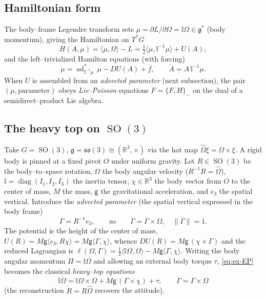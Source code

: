\documentclass[11pt]{article}
\theoremstyle{definition}
\theoremstyle{plain}
\newcommand{\g}{\mathfrak{g}}
\newcommand{\ad}{\operatorname{ad}}
\newcommand{\inner}[2]{\langle #1, #2\rangle}
\newcommand{\norm}[1]{\lVert #1 \rVert}
\newcommand{\so}{\mathfrak{so}}
\newcommand{\grav}{\mathsf{g}}
\newcommand{\hatm}[1]{\widehat{#1}}
\newcommand{\Inertia}{\mathbb{I}}
\DeclareMathOperator{\SO}{SO}
\begin{document}
\subsection{Hamiltonian form}
\label{ss:ex-hamiltonian}

The body--frame Legendre transform sets $\mu=\partial L/\partial\Omega=\Inertia\Omega\in\g^{*}$
(body momentum), giving the Hamiltonian on $T^{*}G$
\begin{equation}\label{eq:ex-hamiltonian}
  H(A,\mu)=\inner{\mu}{\Omega}-L=\tfrac12\inner{\mu}{\Inertia^{-1}\mu}+U(A),
\end{equation}
and the left--trivialized Hamilton equations (with forcing)
\begin{equation}\label{eq:ex-ham-eqs}
  \dot\mu=\ad^{*}_{\Inertia^{-1}\mu}\,\mu-DU(A)+f,
  \qquad \dot A=A\,\Inertia^{-1}\mu .
\end{equation}
When $U$ is assembled from an \emph{advected parameter} (next subsection), the pair
$(\mu,\text{parameter})$ obeys \emph{Lie--Poisson} equations $\dot F=\{F,H\}_{-}$ on the dual
of a semidirect--product Lie algebra.

\subsection{The heavy top on $\SO(3)$}
\label{ss:heavytop}

Take $G=\SO(3)$, $\g=\so(3)\cong(\mathbb{R}^{3},\times)$ via the hat map
$\hatm{\Omega}\xi=\Omega\times\xi$. A rigid body is pinned at a fixed pivot $O$ under uniform
gravity. Let $R\in\SO(3)$ be the body--to--space rotation, $\Omega$ the body angular
velocity ($R^{-1}\dot R=\hatm{\Omega}$), $\Inertia=\operatorname{diag}(I_{1},I_{2},I_{3})$ the
inertia tensor, $\chi\in\mathbb{R}^{3}$ the body vector from $O$ to the center of mass, $M$
the mass, $\grav$ the gravitational acceleration, and $e_{3}$ the spatial vertical.
Introduce the \emph{advected parameter} (the spatial vertical expressed in the body frame)
\begin{equation}\label{eq:advected}
  \Gamma=R^{-1}e_{3},
  \qquad\text{so}\qquad
  \dot\Gamma=\Gamma\times\Omega,\quad \norm{\Gamma}=1 .
\end{equation}
The potential is the height of the center of mass,
$U(R)=M\grav\inner{e_{3}}{R\chi}=M\grav\inner{\Gamma}{\chi}$, whence
$DU(R)=M\grav\,(\chi\times\Gamma)$ and the reduced Lagrangian is
$\ell(\Omega,\Gamma)=\tfrac12\inner{\Inertia\Omega}{\Omega}-M\grav\inner{\Gamma}{\chi}$.
Writing the body angular momentum $\Pi=\Inertia\Omega$ and allowing an external body torque
$\tau$, \eqref{eq:ex-EP} becomes the classical \emph{heavy--top equations}
\begin{equation}\label{eq:heavytop}
  \boxed{\;
  \Inertia\dot\Omega=\Inertia\Omega\times\Omega+M\grav\,(\Gamma\times\chi)+\tau,
  \qquad
  \dot\Gamma=\Gamma\times\Omega \; }
\end{equation}
(the reconstruction $\dot R=R\hatm{\Omega}$ recovers the attitude).
\end{document}

